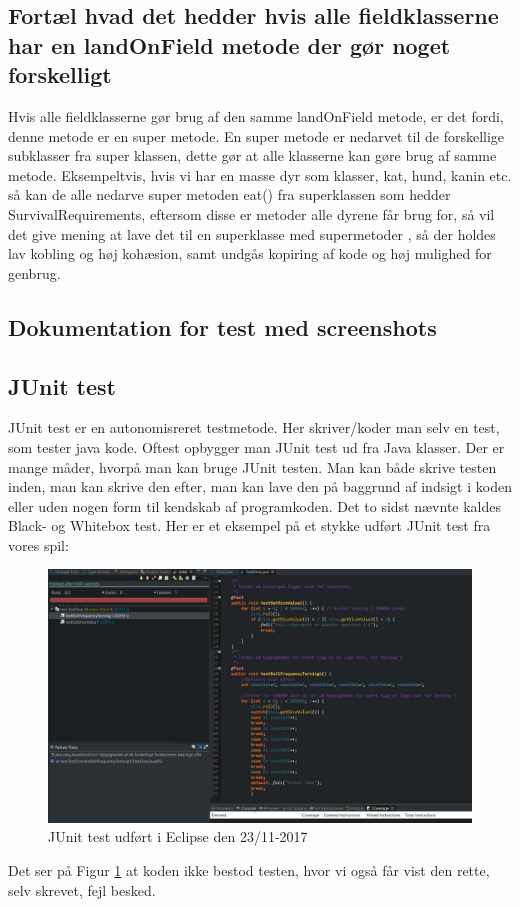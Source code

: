 \subsection{Fortæl hvad det hedder hvis alle fieldklasserne har en landOnField metode der gør noget forskelligt}

Hvis alle fieldklasserne gør brug af den samme landOnField metode, er det fordi, denne metode er en super metode. En super metode er nedarvet til de forskellige subklasser fra super klassen, dette gør at alle klasserne kan gøre brug af samme metode. Eksempeltvis, hvis vi har en masse dyr som klasser, kat, hund, kanin etc. så kan de alle nedarve super metoden eat() fra 
superklassen som hedder SurvivalRequirements, eftersom disse er metoder alle dyrene får brug for, så vil det give mening at lave det til en superklasse med supermetoder
, så der holdes lav kobling og høj kohæsion, samt undgås kopiring af kode og høj mulighed for genbrug.

\subsection{Dokumentation for test med screenshots}
    \subsection{JUnit test}
        JUnit test er en autonomisreret testmetode. Her skriver/koder man selv en test, som tester java kode. Oftest opbygger man JUnit test ud fra Java klasser.
        Der er mange måder, hvorpå man kan bruge JUnit testen. Man kan både skrive testen inden, man kan skrive den efter, man kan lave den på baggrund af indsigt i koden eller uden nogen form til kendskab af programkoden. Det to sidst nævnte kaldes Black- og Whitebox test.
        Her er et eksempel på et stykke udført JUnit test fra vores spil:
            \begin{figure}[h]\label{fig:JUnitTest} %
                \advance\leftskip-3cm
                \includegraphics[width=20cm]{fig/JUnitTestDice.jpg}
                \caption{JUnit test udført i Eclipse den 23/11-2017}
            \end{figure}
        Det ser på Figur \ref{fig:JUnitTest} at koden ikke bestod testen, hvor vi også får vist den rette, selv skrevet, fejl besked.

